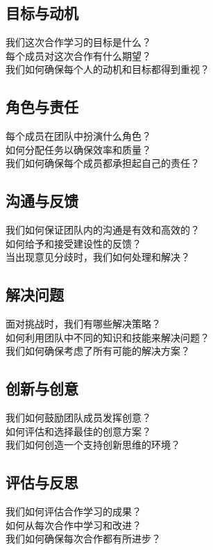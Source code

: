 \documentclass[12pt]{book}
\begin{document}
\subsection{目标与动机}
我们这次合作学习的目标是什么？\\
每个成员对这次合作有什么期望？\\
我们如何确保每个人的动机和目标都得到重视？\\

\subsection{角色与责任}
每个成员在团队中扮演什么角色？\\
如何分配任务以确保效率和质量？\\
我们如何确保每个成员都承担起自己的责任？\\

\subsection{沟通与反馈}
我们如何保证团队内的沟通是有效和高效的？\\
如何给予和接受建设性的反馈？\\
当出现意见分歧时，我们如何处理和解决？\\

\subsection{解决问题}
面对挑战时，我们有哪些解决策略？\\
如何利用团队中不同的知识和技能来解决问题？\\
我们如何确保考虑了所有可能的解决方案？\\

\subsection{创新与创意}
我们如何鼓励团队成员发挥创意？\\
如何评估和选择最佳的创意方案？\\
我们如何创造一个支持创新思维的环境？\\

\subsection{评估与反思}
我们如何评估合作学习的成果？\\
如何从每次合作中学习和改进？\\
我们如何确保每次合作都有所进步？\\
\end{document}
